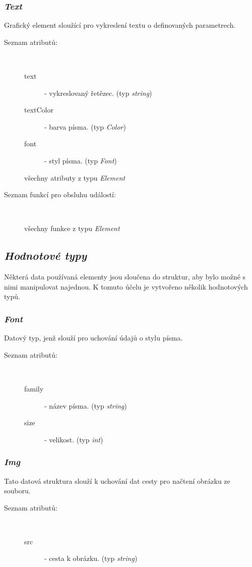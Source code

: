 \documentclass{article}
\begin{document}
\subsubsection{\textit{Text}}
Grafický element sloužící pro vykreslení textu o definovaných parametrech.\\
\begin{description}
\item[Seznam atributů:] ~
\begin{description}
\item[text] - vykreslovaný řetězec. (typ \textit{string})
\item[textColor] - barva písma. (typ \textit{Color})
\item[font] - styl písma. (typ \textit{Font})
\item[všechny atributy z typu \textit{Element}]
\end{description}
\item[Seznam funkcí pro obsluhu událostí:] ~
\begin{description}
\item[všechny funkce z typu \textit{Element}]
\end{description}
\end{description}

\subsection{\textit{Hodnotové typy}}
Některá data používaná elementy jsou sloučena do struktur, aby bylo možné s nimi manipulovat najednou. K tomuto účelu je vytvořeno několik hodnotových typů.
\subsubsection{\textit{Font}}
Datový typ, jenž slouží pro uchování údajů o stylu písma.\\
\begin{description}
\item[Seznam atributů:] ~
\begin{description}
\item[family] - název písma. (typ \textit{string})
\item[size] - velikost. (typ \textit{int})
\end{description}
\end{description}

\subsubsection{\textit{Img}}
Tato datová struktura slouží k uchování dat cesty pro načtení obrázku ze souboru.\\
\begin{description}
\item[Seznam atributů:] ~
\begin{description}
\item[src] - cesta k obrázku. (typ \textit{string})
\end{description}
\end{description}
\end{document}
